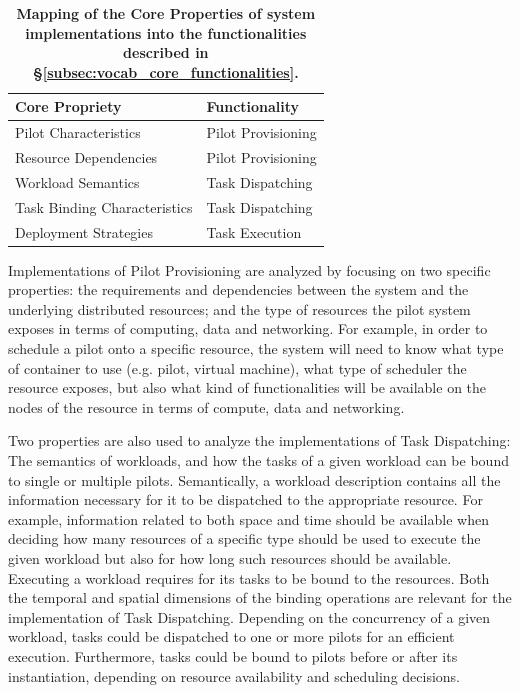 \documentclass{sig-alternate}
\begin{document}
\begin{table}
\centering
 \begin{tabular}{|l|l|}
  \hline
    \textbf{Core Propriety} & \textbf{Functionality} \\ \hline
  \hline
    Pilot Characteristics & Pilot Provisioning \\
  \hline
    Resource Dependencies & Pilot Provisioning \\
  \hline
    Workload Semantics & Task Dispatching \\
  \hline
    Task Binding Characteristics & Task Dispatching \\
  \hline
    Deployment Strategies & Task Execution \\ \hline
 \end{tabular}
 \caption{\textbf{Mapping of the Core Properties of \pilotjob system
                  implementations into the functionalities described in
                  \S\ref{subsec:vocab_core_functionalities}.}\up}
 \label{table:core_properties}
\end{table}

Implementations of Pilot Provisioning are analyzed by focusing on two specific
properties: the requirements and dependencies between the \pilotjob system and
the underlying distributed resources; and the type of resources the pilot
system exposes in terms of computing, data and networking. For example, in
order to schedule a pilot onto a specific resource, the \pilotjob system will
need to know what type of container to use (e.g. pilot, virtual machine), what
type of scheduler the resource exposes, but also what kind of functionalities
will be available on the nodes of the resource in terms of compute, data and
networking.


Two properties are also used to analyze the implementations of Task
Dispatching: The semantics of workloads, and how the tasks of a given workload
can be bound to single or multiple pilots. Semantically, a workload description
contains all the information necessary for it to be dispatched to the
appropriate resource. For example, information related to both space and time
should be available when deciding how many resources of a specific type should
be used to execute the given workload but also for how long such resources
should be available. Executing a workload requires for its tasks to be bound to
the resources. Both the temporal and spatial dimensions of the binding
operations are relevant for the implementation of Task Dispatching. Depending
on the concurrency of a given workload, tasks could be dispatched to one or
more pilots for an efficient execution. Furthermore, tasks could be bound to
pilots before or after its instantiation, depending on resource availability
and scheduling decisions.
\end{document}
